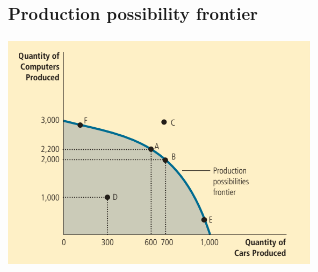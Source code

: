 \documentclass[aspectratio=169]{beamer}
\begin{document}
\begin{frame}
    \frametitle{Production possibility frontier}
    \centering
    \includegraphics[width = 0.6\textwidth,keepaspectratio]{model2.png}
\end{frame}


\end{document}
